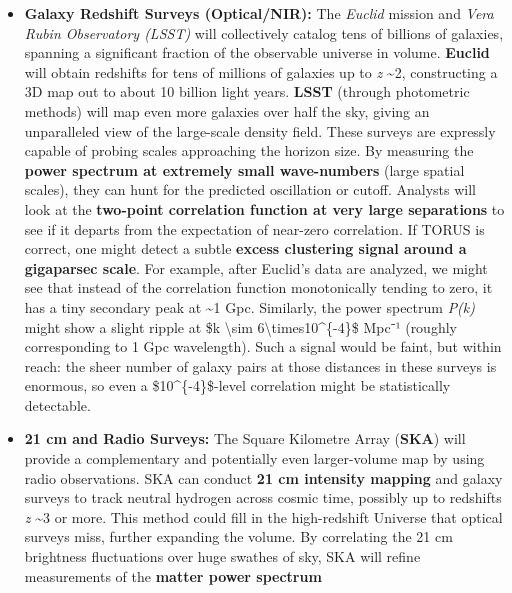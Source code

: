 \documentclass[
]{article}
\begin{document}
{\begin{itemize}
\item
  \textbf{Galaxy Redshift Surveys (Optical/NIR):} The \emph{Euclid}
  mission and \emph{Vera Rubin Observatory (LSST)} will collectively
  catalog tens of billions of galaxies, spanning a significant fraction
  of the observable universe in volume. \textbf{Euclid} will obtain
  redshifts for tens of millions of galaxies up to \emph{z}
  \textasciitilde2, constructing a 3D map out to about 10 billion light
  years. \textbf{LSST} (through photometric methods) will map even more
  galaxies over half the sky, giving an unparalleled view of the
  large-scale density field. These surveys are expressly capable of
  probing scales approaching the horizon size. By measuring the
  \textbf{power spectrum at extremely small wave-numbers} (large spatial
  scales), they can hunt for the predicted oscillation or cutoff.
  Analysts will look at the \textbf{two-point correlation function at
  very large separations} to see if it departs from the \LambdaCDM expectation
  of near-zero correlation\hspace{0pt}. If TORUS is correct, one might
  detect a subtle \textbf{excess clustering signal around a gigaparsec
  scale}\hspace{0pt}. For example, after Euclid's data are analyzed, we
  might see that instead of the correlation function monotonically
  tending to zero, it has a tiny secondary peak at \textasciitilde1 Gpc.
  Similarly, the power spectrum \emph{P(k)} might show a slight ripple
  at \$k \textbackslash sim 6\textbackslash times10\^{}\{-4\}\$ Mpc⁻¹
  (roughly corresponding to 1 Gpc wavelength). Such a signal would be
  faint, but within reach: the sheer number of galaxy pairs at those
  distances in these surveys is enormous, so even a
  \$10\^{}\{-4\}\$-level correlation might be statistically
  detectable\hspace{0pt}.
\item
  \textbf{21 cm and Radio Surveys:} The Square Kilometre Array
  (\textbf{SKA}) will provide a complementary and potentially even
  larger-volume map by using radio observations. SKA can conduct
  \textbf{21 cm intensity mapping} and galaxy surveys to track neutral
  hydrogen across cosmic time, possibly up to redshifts \emph{z}
  \textasciitilde3 or more. This method could fill in the high-redshift
  Universe that optical surveys miss, further expanding the volume. By
  correlating the 21 cm brightness fluctuations over huge swathes of
  sky, SKA will refine measurements of the \textbf{matter power spectrum
}
\end{itemize}}
\end{document}
